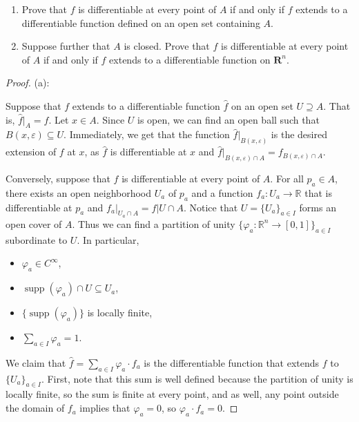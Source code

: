 \documentclass{article}
\newcommand{\R}{\mathbf{R}}
\theoremstyle{plain} %
\numberwithin{thm}{section} %
\theoremstyle{definition}
\begin{document}
        \begin{enumerate}[label=(\alph*)]
            \item Prove that $f$ is differentiable at every point of $A$ if and only if $f$ extends to a differentiable function defined on an open set containing $A$.

            \item Suppose further that $A$ is closed. Prove that $f$ is differentiable at every point of $A$ if and only if $f$ extends to a differentiable function on $\R^n$.
        \end{enumerate}
        \begin{proof}
            (a):

            Suppose that \(f\) extends to a differentiable function \(\hat{f}\) on an open set \(U \supseteq A\). That is, \(\hat{f}\vert _A = f\). Let \(x \in A\). Since \(U\) is open, we can find an open ball such that \(B(x, \varepsilon) \subseteq U\). Immediately, we get that the function \(\hat{f} \vert _{B(x,\varepsilon)}\) is the desired extension of \(f\) at \(x\), as \(\hat{f}\) is differentiable at \(x\) and \(\hat{f}\vert _{B(x,\varepsilon) \cap A} = f_{B(x,\varepsilon) \cap A}\).
    
    
            Conversely, suppose that \(f\) is differentiable at every point of \(A\). For all \(p_a \in A\), there exists an open neighborhood \(U_a\) of \(p_a\) and a function \(f_a : U_a \to \mathbb{R}\) that is differentiable at \(p_a\) and \(f_a \vert _{U_a \cap A} = f \vert U \cap A\). Notice that \(U = \{U_a\}_{a \in I}\) forms an open cover of \(A\). Thus we can find a partition of unity \(\{ \varphi _a : \mathbb{R}^n \to [0,1]\}_{a\in I}\) subordinate to \(U\). In particular,
            \begin{itemize}
                \item \(\varphi _a \in C^{\infty}\),
                \item \(\mathop{\mathrm{supp}}(\varphi _a)\cap U \subseteq U_a\),
                \item \(\{\mathop{\mathrm{supp}}(\varphi_a)\}\) is locally finite,
                \item \(\sum\limits_{a \in I} \varphi _a = 1\).
            \end{itemize}
            We claim that \(\hat{f} = \sum_{a \in I} \varphi _a \cdot f_a\) is the differentiable function that extends \(f\) to \(\{ U_a \} _{a \in I}\). First, note that this sum is well defined because the partition of unity is locally finite, so the sum is finite at every point, and as well, any point outside the domain of \(f_a\) implies that \(\varphi _a = 0\), so \(\varphi _a \cdot f_a = 0\).
    

\end{proof}
\end{document}
